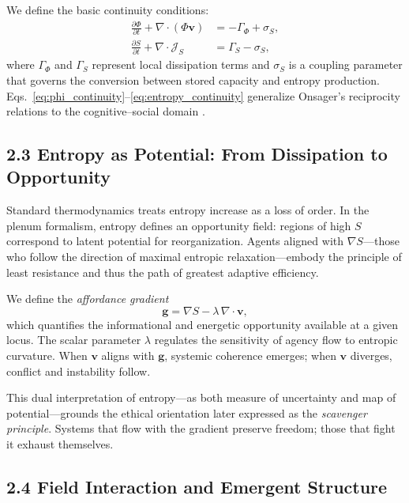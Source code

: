 \documentclass[11pt,a4paper,titlepage]{article}
\theoremstyle{definition}
\begin{document}
We define the basic continuity conditions:
\begin{align}
\frac{\partial \Phi}{\partial t} + \nabla\!\cdot(\Phi \mathbf{v}) &= -\Gamma_\Phi + \sigma_S, \label{eq:phi_continuity}\\
\frac{\partial S}{\partial t} + \nabla\!\cdot \mathcal{J}_S &= \Gamma_S - \sigma_S, \label{eq:entropy_continuity}
\end{align}
where $\Gamma_\Phi$ and $\Gamma_S$ represent local dissipation terms and
$\sigma_S$ is a coupling parameter that governs the conversion between stored
capacity and entropy production.
Eqs.~\eqref{eq:phi_continuity}–\eqref{eq:entropy_continuity} generalize
Onsager’s reciprocity relations to the cognitive–social domain
\cite{onsager1931,baez2017}.

\subsection{2.3 Entropy as Potential: From Dissipation to Opportunity}

Standard thermodynamics treats entropy increase as a loss of order.
In the plenum formalism, entropy defines an opportunity field:
regions of high $S$ correspond to latent potential for reorganization.
Agents aligned with $\nabla S$—those who follow the direction of maximal
entropic relaxation—embody the principle of least resistance and thus the path
of greatest adaptive efficiency.

We define the \emph{affordance gradient}
\begin{equation}
\mathbf{g} = \nabla S - \lambda\,\nabla\!\cdot\mathbf{v},
\label{eq:affordance_gradient}
\end{equation}
which quantifies the informational and energetic opportunity available at a
given locus.  The scalar parameter $\lambda$ regulates the sensitivity of
agency flow to entropic curvature.  When $\mathbf{v}$ aligns with
$\mathbf{g}$, systemic coherence emerges; when $\mathbf{v}$ diverges, conflict
and instability follow.

This dual interpretation of entropy—as both measure of uncertainty and map of
potential—grounds the ethical orientation later expressed as the
\emph{scavenger principle}.  Systems that flow with the gradient preserve
freedom; those that fight it exhaust themselves.

\subsection{2.4 Field Interaction and Emergent Structure}
\end{document}
